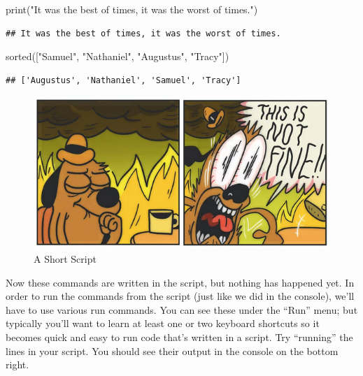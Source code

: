 \documentclass[]{Nemilov}
\newenvironment{Shaded}{\begin{snugshade}}{\end{snugshade}}
\newcommand{\BuiltInTok}[1]{#1}
\newcommand{\NormalTok}[1]{#1}
\newcommand{\StringTok}[1]{\textcolor[rgb]{0.31,0.60,0.02}{#1}}
\begin{document}
\begin{Shaded}
\begin{Highlighting}[]
\BuiltInTok{print}\NormalTok{(}\StringTok{"It was the best of times, it was the worst of times."}\NormalTok{)}
\end{Highlighting}
\end{Shaded}

\begin{verbatim}
## It was the best of times, it was the worst of times.
\end{verbatim}

\begin{Shaded}
\begin{Highlighting}[]
\BuiltInTok{sorted}\NormalTok{([}\StringTok{"Samuel"}\NormalTok{, }\StringTok{"Nathaniel"}\NormalTok{, }\StringTok{"Augustus"}\NormalTok{, }\StringTok{"Tracy"}\NormalTok{])}
\end{Highlighting}
\end{Shaded}

\begin{verbatim}
## ['Augustus', 'Nathaniel', 'Samuel', 'Tracy']
\end{verbatim}

\begin{figure}
\centering
\includegraphics{figures/FIXME.png}
\caption{\label{fig:py-getting-started-short-script}A Short Script}
\end{figure}

Now these commands are written in the script, but nothing has happened yet.
In order to run the commands from the script (just like we did in the console),
we'll have to use various run commands. You can see these under the ``Run'' menu;
but typically you'll want to learn at least one or two keyboard shortcuts so
it becomes quick and easy to run code that's written in a script. Try ``running''
the lines in your script. You should see their output in the console on the
bottom right.
\end{document}
